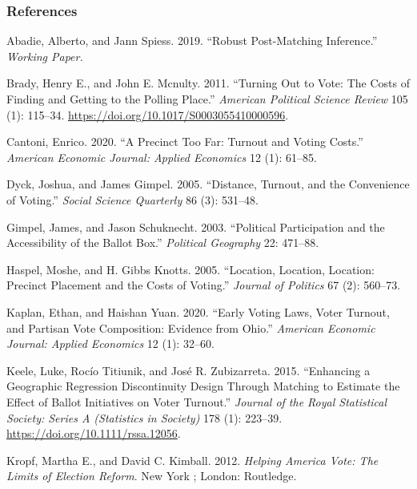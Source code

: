 \documentclass[
  12pt,
]{article}
\newlength{\cslhangindent}
\newenvironment{cslreferences}%
  {\setlength{\parindent}{0pt}%
  \everypar{\setlength{\hangindent}{\cslhangindent}}\ignorespaces}%
  {\par}
\begin{document}
\newpage

\hypertarget{references}{%
\subsubsection*{References}\label{references}}

\hypertarget{refs}{}
\begin{cslreferences}
\leavevmode\hypertarget{ref-Abadie2019}{}%
Abadie, Alberto, and Jann Spiess. 2019. ``Robust Post-Matching Inference.'' \emph{Working Paper.}

\leavevmode\hypertarget{ref-Brady2011}{}%
Brady, Henry E., and John E. Mcnulty. 2011. ``Turning Out to Vote: The Costs of Finding and Getting to the Polling Place.'' \emph{American Political Science Review} 105 (1): 115--34. \url{https://doi.org/10.1017/S0003055410000596}.

\leavevmode\hypertarget{ref-Cantoni2020}{}%
Cantoni, Enrico. 2020. ``A Precinct Too Far: Turnout and Voting Costs.'' \emph{American Economic Journal: Applied Economics} 12 (1): 61--85.

\leavevmode\hypertarget{ref-Dyck2005}{}%
Dyck, Joshua, and James Gimpel. 2005. ``Distance, Turnout, and the Convenience of Voting.'' \emph{Social Science Quarterly} 86 (3): 531--48.

\leavevmode\hypertarget{ref-Gimpel2003}{}%
Gimpel, James, and Jason Schuknecht. 2003. ``Political Participation and the Accessibility of the Ballot Box.'' \emph{Political Geography} 22: 471--88.

\leavevmode\hypertarget{ref-Haspel2005}{}%
Haspel, Moshe, and H. Gibbs Knotts. 2005. ``Location, Location, Location: Precinct Placement and the Costs of Voting.'' \emph{Journal of Politics} 67 (2): 560--73.

\leavevmode\hypertarget{ref-Kaplan2020}{}%
Kaplan, Ethan, and Haishan Yuan. 2020. ``Early Voting Laws, Voter Turnout, and Partisan Vote Composition: Evidence from Ohio.'' \emph{American Economic Journal: Applied Economics} 12 (1): 32--60.

\leavevmode\hypertarget{ref-Keele2015}{}%
Keele, Luke, Rocío Titiunik, and José R. Zubizarreta. 2015. ``Enhancing a Geographic Regression Discontinuity Design Through Matching to Estimate the Effect of Ballot Initiatives on Voter Turnout.'' \emph{Journal of the Royal Statistical Society: Series A (Statistics in Society)} 178 (1): 223--39. \url{https://doi.org/10.1111/rssa.12056}.

\leavevmode\hypertarget{ref-Kropf2012}{}%
Kropf, Martha E., and David C. Kimball. 2012. \emph{Helping America Vote: The Limits of Election Reform}. New York ; London: Routledge.


\end{cslreferences}
\end{document}
